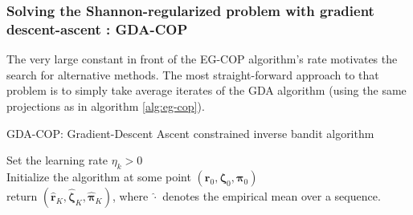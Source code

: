 \subsubsection{Solving the Shannon-regularized problem with gradient descent-ascent : GDA-COP}

The very large constant in front of the EG-COP algorithm's rate motivates the search for alternative methods. The most straight-forward approach to that problem is to simply take average iterates of the GDA algorithm (using the same projections as in algorithm \ref{alg:eg-cop}). 

\begin{algorithm}
    \SetAlgoLined
  \small
    \caption{GDA-COP: Gradient-Descent Ascent constrained inverse bandit algorithm}
    \label{alg:gda-cop}
      Set the learning rate $\eta_k >0$ \\
      Initialize the algorithm at some point $(\bm{r}_0,\bm{\zeta}_0,\bm{\pi}_0)$  \\
      return $(\hat{\bm{r}}_K,\hat{\bm{\zeta}}_K,\hat{\bm{\pi}}_K)$, where $\hat{\cdot}$ denotes the empirical mean over a sequence.
  \end{algorithm}


